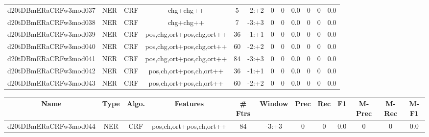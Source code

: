 \documentclass[a4paper]{article}
\begin{document}
\begin{landscape}
\begin{center}
\begin{tabular}{ |c|c|c|c|c|c|c|c|c|c|c|c|}
 
 	
 	\small{ d20tDBmERaCRFw3mod037 } & \small{ NER} & \small{  CRF }  & chg+chg++  &  5 &  \small{  -2:+2 }  &  0 & 0 & 0.0  &  0 & 0 & 0.0 \\
 	

 
 	
 	\small{ d20tDBmERaCRFw3mod038 } & \small{ NER} & \small{  CRF }  & chg+chg++  &  7 &  \small{  -3:+3 }  &  0 & 0 & 0.0  &  0 & 0 & 0.0 \\
 	

 
 	
 	\small{ d20tDBmERaCRFw3mod039 } & \small{ NER} & \small{  CRF }  & pos,chg,ort+pos,chg,ort++  &  36 &  \small{  -1:+1 }  &  0 & 0 & 0.0  &  0 & 0 & 0.0 \\
 	

 
 	
 	\small{ d20tDBmERaCRFw3mod040 } & \small{ NER} & \small{  CRF }  & pos,chg,ort+pos,chg,ort++  &  60 &  \small{  -2:+2 }  &  0 & 0 & 0.0  &  0 & 0 & 0.0 \\
 	

 
 	
 	\small{ d20tDBmERaCRFw3mod041 } & \small{ NER} & \small{  CRF }  & pos,chg,ort+pos,chg,ort++  &  84 &  \small{  -3:+3 }  &  0 & 0 & 0.0  &  0 & 0 & 0.0 \\
 	

 
 	
 	\small{ d20tDBmERaCRFw3mod042 } & \small{ NER} & \small{  CRF }  & pos,ch,ort+pos,ch,ort++  &  36 &  \small{  -1:+1 }  &  0 & 0 & 0.0  &  0 & 0 & 0.0 \\
 	

 
 	
 	\small{ d20tDBmERaCRFw3mod043 } & \small{ NER} & \small{  CRF }  & pos,ch,ort+pos,ch,ort++  &  60 &  \small{  -2:+2 }  &  0 & 0 & 0.0  &  0 & 0 & 0.0 \\
 	
 \hline
\end{tabular}
\end{center}




\begin{center}
\begin{tabular}{ |c|c|c|c|c|c|c|c|c|c|c|c|} 
 \hline
 	Name & Type & Algo. & Features & \# Ftrs & Window & Prec & Rec & F1 & M-Prec & M-Rec & M-F1\\
 \hline

 	

 
 	
 	\small{ d20tDBmERaCRFw3mod044 } & \small{ NER} & \small{  CRF }  & pos,ch,ort+pos,ch,ort++  &  84 &  \small{  -3:+3 }  &  0 & 0 & 0.0  &  0 & 0 & 0.0 \\
 	


\end{tabular}
\end{center}
\end{landscape}
\end{document}
